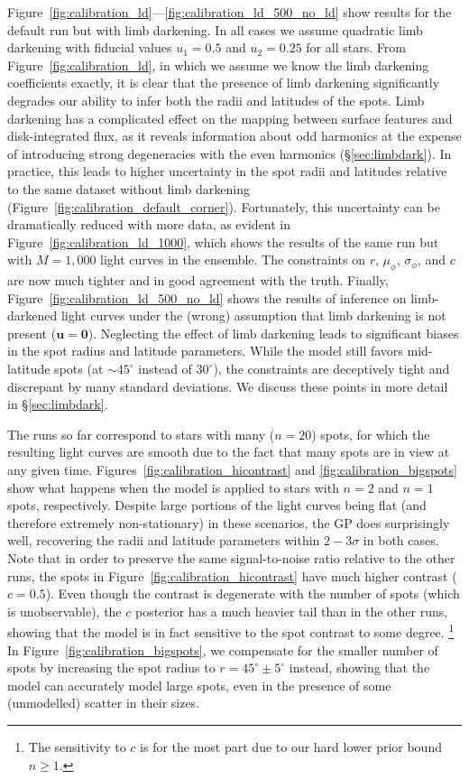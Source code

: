 \documentclass[modern]{aastex62}
\begin{document}
Figure~\ref{fig:calibration_ld}---\ref{fig:calibration_ld_500_no_ld}
show results for the default run but with limb darkening. In all cases
we assume quadratic limb darkening with fiducial values $u_1 = 0.5$
and $u_2 = 0.25$ for all stars. From Figure~\ref{fig:calibration_ld}, in which we
assume we know the limb darkening coefficients exactly, it is clear that
the presence of limb darkening significantly degrades our ability to
infer both the radii and latitudes of the spots. Limb darkening has a complicated
effect on the mapping between surface features and disk-integrated flux, as it
reveals information about odd harmonics at
the expense of introducing strong degeneracies with the even harmonics
(\S\ref{sec:limbdark}). In practice, this leads to higher uncertainty in
the spot radii and latitudes relative to the same dataset without limb
darkening (Figure~\ref{fig:calibration_default_corner}). Fortunately,
this uncertainty can be dramatically reduced with more data, as evident
in Figure~\ref{fig:calibration_ld_1000}, which shows the results of the
same run but with $M=1{,}000$ light curves in the ensemble. The constraints
on $r$, $\mu_\phi$, $\sigma_\phi$, and $c$ are now much tighter and in
good agreement with the truth. Finally, Figure~\ref{fig:calibration_ld_500_no_ld}
shows the results of inference on limb-darkened light curves under the
(wrong) assumption that limb darkening is not present ($\mathbf{u} = \mathbf{0}$).
Neglecting the effect of limb darkening leads to significant biases in the spot radius
and latitude parameters. While the model still favors mid-latitude spots
(at $\sim 45^\circ$ instead of $30^\circ$), the constraints are deceptively tight
and discrepant by many standard deviations. We discuss these points in
more detail in \S\ref{sec:limbdark}.

The runs so far correspond to stars with many ($n = 20$) spots, for which the
resulting light curves are smooth due to the fact that many spots are in
view at any given time. Figures~\ref{fig:calibration_hicontrast} and
\ref{fig:calibration_bigspots} show what happens when the model is applied to
stars with $n=2$ and $n=1$ spots, respectively. Despite large portions of the
light curves being flat (and therefore extremely non-stationary)
in these scenarios, the GP does surprisingly well, recovering the radii
and latitude parameters within $2-3\sigma$ in both cases.
Note that in order to preserve the same signal-to-noise ratio relative to
the other runs, the spots in Figure~\ref{fig:calibration_hicontrast}
have much higher contrast ($c = 0.5$). Even though the contrast is degenerate
with the number of spots (which is unobservable), the $c$ posterior
has a much heavier tail than in the other runs, showing that the model is
in fact sensitive to the spot contrast to some degree.%
\footnote{The sensitivity to $c$ is for the most part
    due to our hard lower prior bound $n \ge 1$.}
In Figure~\ref{fig:calibration_bigspots}, we compensate for the smaller number
of spots by increasing the spot radius to $r = 45^\circ \pm 5^\circ$ instead,
showing that the model can accurately model large spots, even in the
presence of some (unmodelled) scatter in their sizes.
\end{document}
